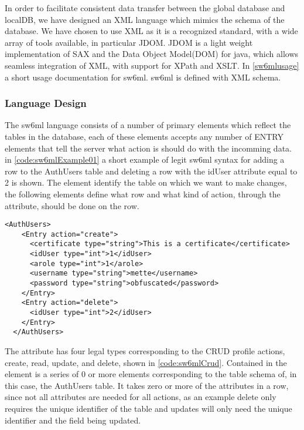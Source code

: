 In order to facilitate consistent data transfer between the global database and localDB, we have designed an XML language which mimics
the schema of the database. We have chosen to use XML as it is a recognized standard, with a wide array of tools available, in particular JDOM\cite{www.jdom.org}.
JDOM is a light weight implementation of SAX and the Data Object Model(DOM) for java, which allows seamless integration of XML, with support for XPath and XSLT.
In \ref{sw6mlusage} a short usage documentation for sw6ml. sw6ml is defined with XML schema.

\subsubsection{Language Design}

The sw6ml language consists of a number of primary elements which reflect the tables in the database, each of these elements accepts any number of ENTRY elements that tell
the server what action is should do with the incomming data.
in \autoref{code:sw6mlExample01} a short example of legit sw6ml syntax for adding a row to the AuthUsers table and deleting a row with the idUser attribute equal to 2 is shown.
The  element identify the table on which we want to make changes, the following  elements
define what row and what kind of action, through the  attribute, should be done on the row. 


\begin{lstlisting}[label=code:sw6mlExample01,caption=Example of sw6ml syntax]
 <AuthUsers>
    <Entry action="create">
      <certificate type="string">This is a certificate</certificate>
      <idUser type="int">1</idUser>
      <arole type="int">1</arole>
      <username type="string">mette</username>
      <password type="string">obfuscated</password>
    </Entry>
    <Entry action="delete">
      <idUser type="int">2</idUser>
    </Entry>
  </AuthUsers>
\end{lstlisting}
The  attribute has four legal types corresponding to the CRUD profile actions, create, read, update, and delete, shown in \autoref{code:sw6mlCrud}.
Contained in the   element is a series of 0 or more elements corresponding to the table schema of, in this case, the AuthUsers table.
It takes zero or more of the attributes in a row, since not all attributes are needed for all actions, as an example delete only requires the unique identifier of the table and
updates will only need the unique identifier and the field being updated.

